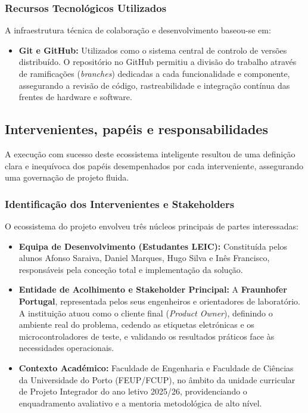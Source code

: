 \documentclass[10pt]{article}
\begin{document}
\subsubsection*{Recursos Tecnológicos Utilizados}
A infraestrutura técnica de colaboração e desenvolvimento baseou-se em:
\begin{itemize}
    \item \textbf{Git e GitHub:} Utilizados como o sistema central de controlo de versões distribuído. O repositório no GitHub permitiu a divisão do trabalho através de ramificações (\textit{branches}) dedicadas a cada funcionalidade e componente, assegurando a revisão de código, rastreabilidade e integração contínua das frentes de hardware e software.
\end{itemize}
	
\subsection{Intervenientes, papéis e responsabilidades}

A execução com sucesso deste ecossistema inteligente resultou de uma definição clara e inequívoca dos papéis desempenhados por cada interveniente, assegurando uma governação de projeto fluida.

\subsubsection*{Identificação dos Intervenientes e Stakeholders}

O ecossistema do projeto envolveu três núcleos principais de partes interessadas:
\begin{itemize}
    \item \textbf{Equipa de Desenvolvimento (Estudantes LEIC):} Constituída pelos alunos Afonso Saraiva, Daniel Marques, Hugo Silva e Inês Francisco, responsáveis pela conceção total e implementação da solução.
    \item \textbf{Entidade de Acolhimento e Stakeholder Principal:} A \textbf{Fraunhofer Portugal}, representada pelos seus engenheiros e orientadores de laboratório. A instituição atuou como o cliente final (\textit{Product Owner}), definindo o ambiente real do problema, cedendo as etiquetas eletrónicas e os microcontroladores de teste, e validando os resultados práticos face às necessidades operacionais.
    \item \textbf{Contexto Académico:} Faculdade de Engenharia e Faculdade de Ciências da Universidade do Porto (FEUP/FCUP), no âmbito da unidade curricular de Projeto Integrador do ano letivo 2025/26, providenciando o enquadramento avaliativo e a mentoria metodológica de alto nível.
\end{itemize}
\end{document}
